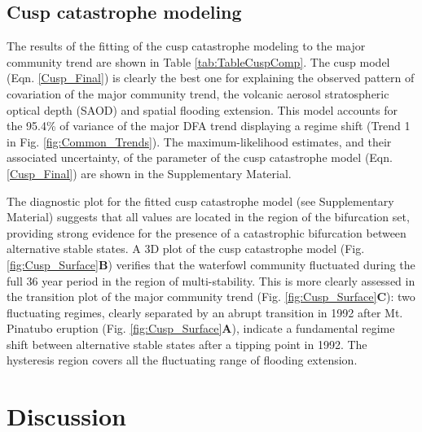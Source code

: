 \documentclass[12pt]{article}
\begin{document}
\subsection*{Cusp catastrophe modeling}
\label{subsec:Cusp catastrophe modeling}

The results of the fitting of the cusp catastrophe modeling to the major community trend are shown in Table \ref{tab:TableCuspComp}. The cusp model (Eqn. \ref{Cusp_Final}) is clearly the best one for explaining the observed pattern of covariation of the major community trend, the volcanic aerosol stratospheric optical depth (SAOD) and spatial flooding extension. This model accounts for the 95.4\% of variance of the major DFA trend displaying a regime shift (Trend 1 in Fig. \ref{fig:Common_Trends}). The maximum-likelihood estimates, and their associated uncertainty, of the parameter of the cusp catastrophe model (Eqn. \ref{Cusp_Final}) are shown in the Supplementary Material.

The diagnostic plot for the fitted cusp catastrophe model (see Supplementary Material) suggests that all values are located in the region of the bifurcation set, providing strong evidence for the presence of a catastrophic bifurcation between alternative stable states. A 3D plot of the cusp catastrophe model (Fig. \ref{fig:Cusp_Surface}\textbf{B}) verifies that the waterfowl community fluctuated during the full 36 year period in the region of multi-stability. This is more clearly assessed in the transition plot of the major community trend (Fig. \ref{fig:Cusp_Surface}\textbf{C}): two fluctuating regimes, clearly separated by an abrupt transition in 1992 after Mt. Pinatubo eruption (Fig. \ref{fig:Cusp_Surface}\textbf{A}), indicate a fundamental regime shift between alternative stable states after a tipping point in 1992. The hysteresis region covers all the fluctuating range of flooding extension. \\

\section*{Discussion}
\label{sec:Discussion}
\end{document}
